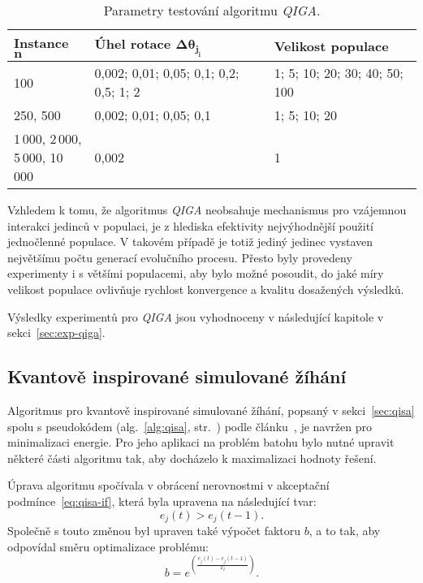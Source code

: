 \begin{table}[ht]
  \centering
  \begin{tabularx}{\linewidth}{l X X }
    \toprule
    \textbf{Instance $\boldsymbol{n}$} & \textbf{Úhel rotace $\boldsymbol{\Delta\theta_{j_i}}$} & \textbf{Velikost populace} \\
    \midrule
    100
      & 0,002; 0,01; 0,05; 0,1; 0,2; 0,5; 1; 2
      & 1; 5; 10; 20; 30; 40; 50; 100 \\[1ex]
    250, 500
      & 0,002; 0,01; 0,05; 0,1
      & 1; 5; 10; 20 \\[1ex]
    \makecell{1\,000, 2\,000, \\ 5\,000, 10\,000}
      & 0,002
      & 1 \\
    \bottomrule
  \end{tabularx}
  \caption{Parametry testování algoritmu \emph{QIGA}.}
  \label{tab:qiga-all-instance}
\end{table}


Vzhledem k tomu, že algoritmus \emph{QIGA} neobsahuje mechanismus pro vzájemnou interakci jedinců v populaci, je z hlediska efektivity nejvýhodnější použití jednočlenné populace.
V takovém případě je totiž jediný jedinec vystaven největšímu počtu generací evolučního procesu. 
Přesto byly provedeny experimenty i s většími populacemi, aby bylo možné posoudit, do jaké míry velikost populace ovlivňuje rychlost konvergence a kvalitu dosažených výsledků. 

Výsledky experimentů pro \emph{QIGA} jsou vyhodnoceny v následující kapitole v sekci~\ref{sec:exp-qiga}.

\subsection*{Kvantově inspirované simulované žíhání}
Algoritmus pro kvantově inspirované simulované žíhání, popsaný v sekci~\ref{sec:qisa} spolu s pseudokódem (alg.~\ref{alg:qisa}, str.~\pageref{alg:qisa}) podle článku~\cite{qisa}, je navržen pro minimalizaci energie. 
Pro jeho aplikaci na problém batohu bylo nutné upravit některé části algoritmu tak, aby docházelo k maximalizaci hodnoty řešení.

Úprava algoritmu spočívala v obrácení nerovnostmi v akceptační podmínce~\ref{eq:qisa-if}, která byla upravena na následující tvar:
\begin{equation*}
    e_j\left(t\right) > e_j\left(t-1\right).
\end{equation*}
Společně s touto změnou byl upraven také výpočet faktoru $b$, a to tak, aby odpovídal směru optimalizace problému:
\begin{equation*}
    b = e^{\left(\frac{e_j\left(t\right) - e_j\left(t-1\right)}{T_t}\right)}.
\end{equation*}

